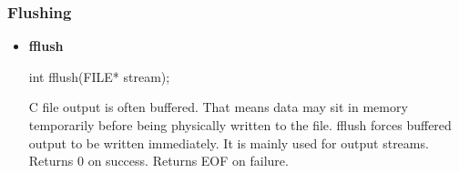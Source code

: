 \documentclass{report}
\begin{document}
    \subsubsection{Flushing}
    \begin{itemize}
        \item \textbf{fflush}
            \bigbreak \noindent 
            \begin{cppcode}
            int fflush(FILE* stream);
            \end{cppcode}
            \bigbreak \noindent 
            C file output is often buffered. That means data may sit in memory temporarily before being physically written to the file. fflush forces buffered output to be written immediately. It is mainly used for output streams.
            \bigbreak \noindent 
            Returns 0 on success. Returns EOF on failure.
    \end{itemize}

    \pagebreak 
\end{document}
